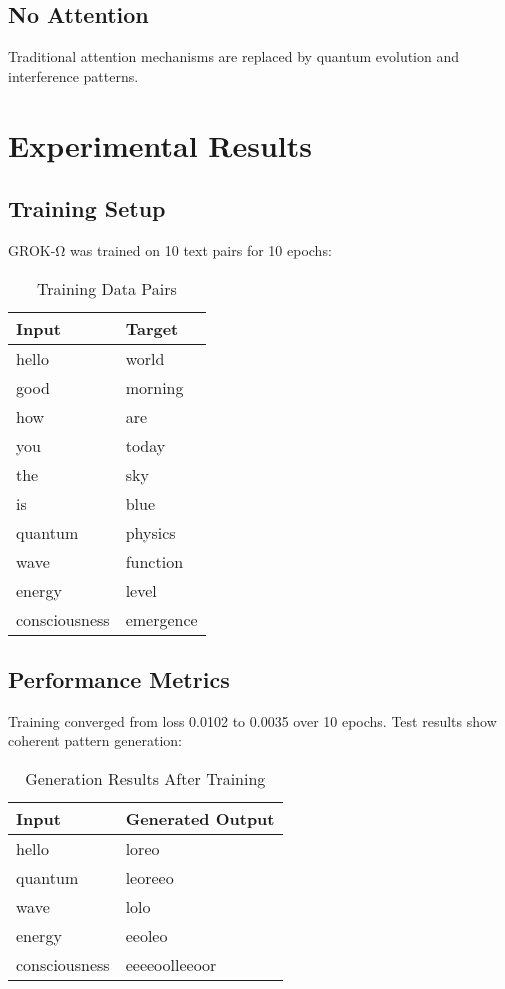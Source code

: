 \documentclass[11pt,a4paper]{article}
\begin{document}
\subsection{No Attention}
Traditional attention mechanisms are replaced by quantum evolution and interference patterns.

\section{Experimental Results}

\subsection{Training Setup}

GROK-Ω was trained on 10 text pairs for 10 epochs:

\begin{table}[H]
\centering
\caption{Training Data Pairs}
\label{tab:training_data}
\begin{tabular}{@{}ll@{}}
\toprule
Input & Target \\
\midrule
hello & world \\
good & morning \\
how & are \\
you & today \\
the & sky \\
is & blue \\
quantum & physics \\
wave & function \\
energy & level \\
consciousness & emergence \\
\bottomrule
\end{tabular}
\end{table}

\subsection{Performance Metrics}

Training converged from loss 0.0102 to 0.0035 over 10 epochs. Test results show coherent pattern generation:

\begin{table}[H]
\centering
\caption{Generation Results After Training}
\label{tab:results}
\begin{tabular}{@{}ll@{}}
\toprule
Input & Generated Output \\
\midrule
hello & loreo \\
quantum & leoreeo \\
wave & lolo \\
energy & eeoleo \\
consciousness & eeeeoolleeoor \\
\bottomrule
\end{tabular}
\end{table}
\end{document}
